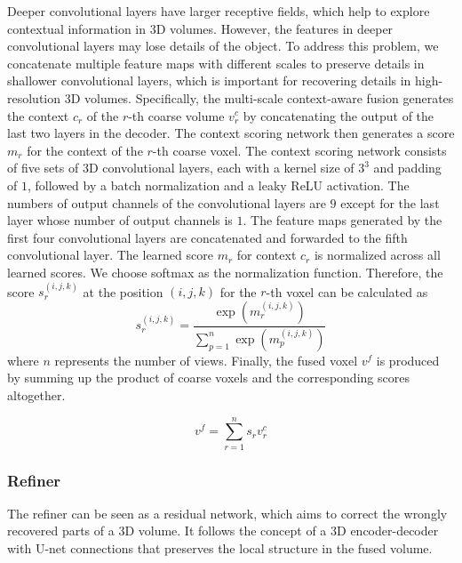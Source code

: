 \documentclass[twocolumn]{svjour3}
\begin{document}
Deeper convolutional layers have larger receptive fields, which help to explore contextual information in 3D volumes.
However, the features in deeper convolutional layers may lose details of the object.
To address this problem, we concatenate multiple feature maps with different scales to preserve details in shallower convolutional layers, which is important for recovering details in high-resolution 3D volumes.
Specifically, the multi-scale context-aware fusion generates the context $c_r$ of the $r$-th coarse volume $v_r^c$ by concatenating the output of the last two layers in the decoder.
The context scoring network then generates a score $m_r$ for the context of the $r$-th coarse voxel.
The context scoring network consists of five sets of 3D convolutional layers, each with a kernel size of $3^3$ and padding of $1$, followed by a batch normalization and a leaky ReLU activation.
The numbers of output channels of the convolutional layers are $9$ except for the last layer whose number of output channels is $1$.
The feature maps generated by the first four convolutional layers are concatenated and forwarded to the fifth convolutional layer.
The learned score $m_r$ for context $c_r$ is normalized across all learned scores.
We choose softmax as the normalization function. 
Therefore, the score $s_r^{(i, j, k)}$ at the position $(i, j, k)$ for the $r$-th voxel can be calculated as 
\begin{equation}
  s_r^{(i, j, k)} = \frac{\exp\left(m_r^{(i, j, k)}\right)}{\sum_{p=1}^n \exp\left(m_p^{(i, j, k)}\right)}  
\end{equation}
where $n$ represents the number of views.
Finally, the fused voxel $v^f$ is produced by summing up the product of coarse voxels and the corresponding scores altogether.

\begin{equation}
  v^f = \sum_{r=1}^n s_r v_r^c
\end{equation}

\subsubsection{Refiner}

The refiner can be seen as a residual network, which aims to correct the wrongly recovered parts of a 3D volume.
It follows the concept of a 3D encoder-decoder with U-net connections \citep{DBLP:conf/miccai/RonnebergerFB15} that preserves the local structure in the fused volume.
\end{document}
